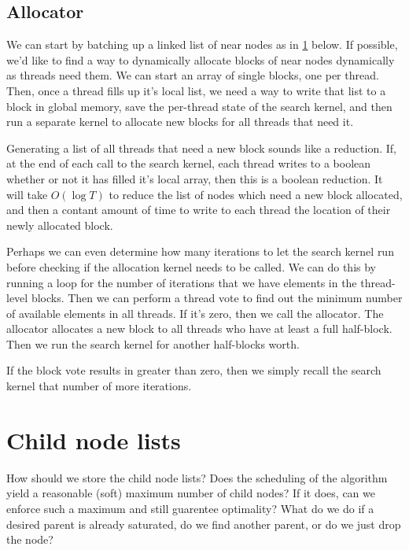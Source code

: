 \subsection{Allocator}
We can start by batching up a linked list of near nodes as in  \ref{a:ChildNodeLists} below. If possible, we'd like to find a way to dynamically allocate blocks of near nodes dynamically as threads need them. We can start an array of single blocks, one per thread. Then, once a thread fills up it's local list, we need a way to write that list to a block in global memory, save the per-thread state of the search kernel, and then run a separate kernel to allocate new blocks for all threads that need it. 

Generating a list of all threads that need a new block sounds like a reduction. If, at the end of each call to the search kernel, each thread writes to a boolean whether or not it has filled it's local array, then this is a boolean reduction. It will take $O(\log T)$ to reduce the list of nodes which need a new block allocated, and then a contant amount of time to write to each thread the location of their newly allocated block. 

\begin{figure}[H]
\begin{centering}
    \texttt{[image: \\figfile\{fig/near\_list\_allocator]}}
    \caption{Near List Allocator}
    \label{fig:near_alloc}
\end{centering} 
\end{figure}

Perhaps we can even determine how many iterations to let the search kernel run before checking if the allocation kernel needs to be called. We can do this by running a loop for the number of iterations that we have elements in the thread-level blocks. Then we can perform a thread vote to find out the minimum number of available elements in all threads. If it's zero, then we call the allocator. The allocator allocates a new block to all threads who have at least a full half-block. Then we run the search kernel for another half-blocks worth.

If the block vote results in greater than zero, then we simply recall the search kernel that number of more iterations.
 



\section{Child node lists}
\label{a:ChildNodeLists}
How should we store the child node lists? Does the scheduling of the algorithm yield a reasonable (soft) maximum number of child nodes? If it does, can we enforce such a maximum and still guarentee optimality? What do we do if a desired parent is already saturated, do we find another parent, or do we just drop the node?

